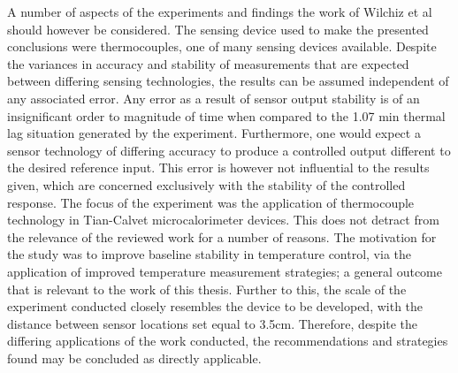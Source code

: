 A number of aspects of the experiments and findings the work of Wilchiz et al should however be considered. The sensing device used to make the presented conclusions were thermocouples, one of many sensing devices available. Despite the variances in accuracy and stability of measurements that are expected between differing sensing technologies, the results can be assumed independent of any associated error. Any error as a result of sensor output stability is of an insignificant order to magnitude of time when compared to the 1.07 min thermal lag situation generated by the experiment. Furthermore, one would expect a sensor technology of differing accuracy to produce a controlled output different to the desired reference input. This error is however not influential to the results given, which are concerned exclusively with the stability of the controlled response. The focus of the experiment was the application of thermocouple technology in Tian-Calvet microcalorimeter devices. This does not detract from the relevance of the reviewed work for a number of reasons. The motivation for the study was to improve baseline stability in temperature control, via the application of improved temperature measurement strategies; a general outcome that is relevant to the work of this thesis. Further to this, the scale of the experiment conducted closely resembles the device to be developed, with the distance between sensor locations set equal to 3.5cm. Therefore, despite the differing applications of the work conducted, the recommendations and strategies found may be concluded as directly applicable.

